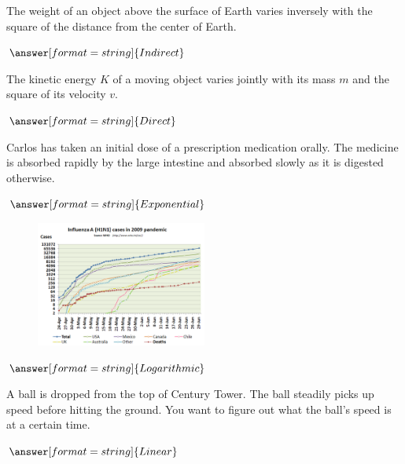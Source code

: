 \documentclass{ximera}
\begin{document}
\begin{question}
The weight of an object above the surface of Earth varies inversely with the square of the distance from the center of Earth. 

$\answer[format=string]{Indirect}$

\end{question}

\begin{question}
The kinetic energy $K$ of a moving object varies jointly with its mass $m$ and the square of its velocity $v$.

$\answer[format=string]{Direct}$

\end{question}

\begin{question}
Carlos has taken an initial dose of a prescription medication orally. The medicine is absorbed rapidly by the large intestine and absorbed slowly as it is digested otherwise. 

$\answer[format=string]{Exponential}$

\end{question}

\begin{question}
\begin{figure}
	\includegraphics[width=0.5\textwidth]{Influenza-2009.png}
\end{figure}

$\answer[format=string]{Logarithmic}$

\end{question}

\begin{question}
A ball is dropped from the top of Century Tower. The ball steadily picks up speed before hitting the ground. You want to figure out what the ball's speed is at a certain time.

$\answer[format=string]{Linear}$
\end{question}
\end{document}
